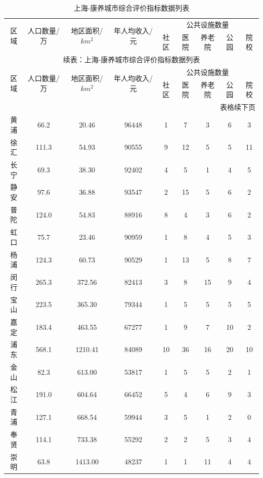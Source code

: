 \documentclass[12pt,a4paper]{article}
\begin{document}
\begin{longtable}{c|c|c|c|ccccc}
\caption{上海-康养城市综合评价指标数据列表} \\
\toprule[2pt]
\multirow{2}{*}{区域} & \multirow{2}{*}{人口数量/万} & \multirow{2}{*}{地区面积/$km^2$}& \multirow{2}{*}{年人均收入\cite{05}/元}& \multicolumn{5}{c}{公共设施数量} \\
\cline{5-9}
& & & & 社区 & 医院 & 养老院 & 公园 & 院校 \\
\midrule[1pt]
\endfirsthead

\multicolumn{9}{c}{续表：上海-康养城市综合评价指标数据列表} \\
\toprule[2pt]
\multirow{2}{*}{区域} & \multirow{2}{*}{人口数量/万} & \multirow{2}{*}{地区面积/$km^2$}& \multirow{2}{*}{年人均收入\cite{05}/元}& \multicolumn{5}{c}{公共设施数量} \\
\cline{5-9}
& & & & 社区 & 医院 & 养老院 & 公园 & 院校 \\
\midrule[1pt]
\endhead

\hline
\multicolumn{9}{r}{表格续下页} \\
\endfoot

\hline
\endlastfoot

黄浦 & 66.2 & 20.46 & 96448 & 1 & 7 & 3 & 6 & 3 \\
徐汇 & 111.3 & 54.93 & 90555 & 9 & 12 & 5 & 5 & 11 \\
长宁 & 69.3 & 38.30 & 92402 & 4 & 5 & 1 & 4 & 5 \\
静安 & 97.6 & 36.88 & 93547 & 2 & 15 & 5 & 6 & 2 \\
普陀 & 124.0 & 54.83 & 88916 & 8 & 4 & 3 & 6 & 2 \\
虹口 & 75.7 & 23.46 & 90959 & 1 & 8 & 4 & 5 & 3 \\
杨浦 & 124.3 & 60.73 & 90529 & 1 & 13 & 5 & 8 & 7 \\
闵行 & 265.3 & 372.56 & 82413 & 3 & 8 & 15 & 9 & 4 \\
宝山 & 223.5 & 365.30 & 79344 & 1 & 5 & 5 & 5 & 5 \\
嘉定 & 183.4 & 463.55 & 67277 & 1 & 9 & 7 & 10 & 2 \\
浦东 & 568.1 & 1210.41 & 84089 & 10 & 36 & 16 & 20 & 10 \\
金山 & 82.3 & 613.00 & 53817 & 1 & 5 & 5 & 2 & 1 \\
松江 & 191.0 & 604.64 & 66452 & 5 & 4 & 6 & 9 & 3 \\
青浦 & 127.1 & 668.54 & 59944 & 3 & 5 & 1 & 2 & 0 \\
奉贤 & 114.1 & 733.38 & 55292 & 2 & 2 & 5 & 3 & 4 \\
崇明 & 63.8 & 1413.00 & 48237 & 1 & 1 & 11 & 4 & 4 \\

\bottomrule[2pt]

\end{longtable}
\end{document}
